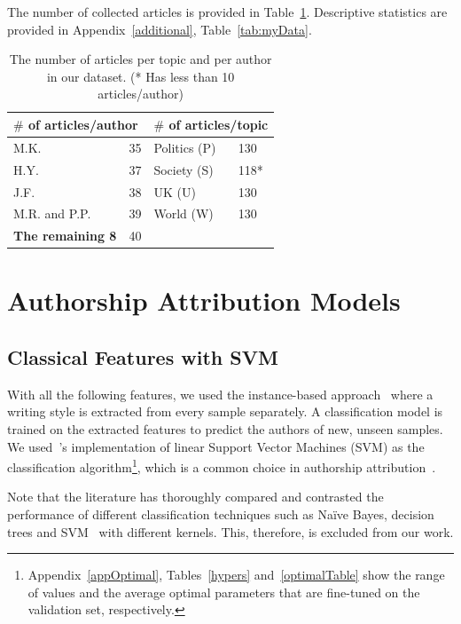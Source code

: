\documentclass[11pt]{article}
\begin{document}
The number of collected articles is provided in Table~\ref{tab:myData_short}. Descriptive statistics are provided in Appendix~\ref{additional}, Table~\ref{tab:myData}.
\begin{table}[ht]
\caption{The number of articles per topic and per author in our dataset. (* Has less than 10 articles/author)}
    \label{tab:myData_short}
    \centering
    \begin{tabular}{ll |ll }
    \hline 
    \multicolumn{2}{l}{\textbf{$\#$ of articles/author}}   & \multicolumn{2}{|l}{\textbf{$\#$ of articles/topic}}  \\
    \hline
     M.K.                & 35   &  Politics (P) & 130 \\ 
     H.Y.                & 37   &  Society (S)  & 118*  \\
     J.F.                & 38   &  UK (U)       & 130    \\
     M.R. and P.P.       & 39   &  World (W)    & 130    \\
     \textbf{The remaining 8}   & 40 & & \\
     \hline
     \end{tabular}
\end{table}

\section{Authorship Attribution Models\label{subsec:QWS}}

\subsection{Classical Features with SVM} 


With all the following features, we used the instance-based approach~\citep{Stamatatos.e:2009} where a writing style is extracted from every sample separately. A classification model is trained on the extracted features to predict the authors of new, unseen samples. We used~\citet{scikit-learn}'s implementation of linear Support Vector Machines (SVM) as the classification algorithm\footnote{Appendix~\ref{appOptimal}, Tables~\ref{hypers} and~\ref{optimalTable} show the range of values and the average optimal parameters that are fine-tuned on the validation set, respectively.}, which is a common choice in authorship attribution~\citep{Stamatatos.E:2017}. 

Note that the literature has thoroughly compared and contrasted the performance of different classification techniques such as Na\"ive Bayes, decision trees and SVM~\citep{Ding.S:2015, malik:2018} with different kernels. This, therefore, is excluded from our work.   
\end{document}
